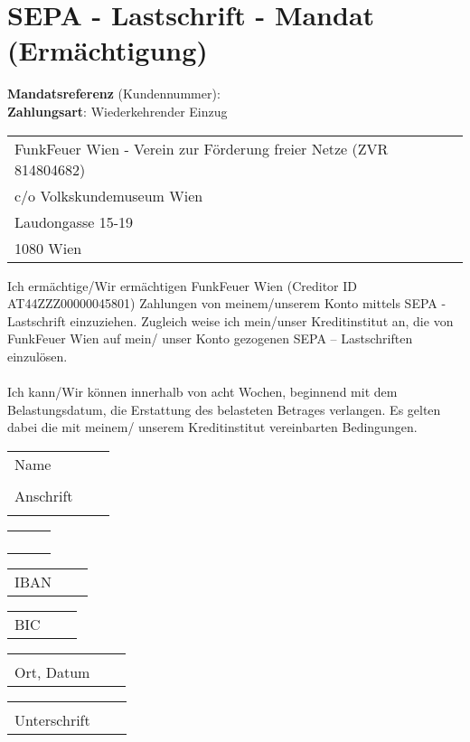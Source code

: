 \documentclass[parskip=half]{scrreprt}
\begin{document}
\chapter*{SEPA - Lastschrift - Mandat (Ermächtigung)}
\thispagestyle{fancy}

\textbf{Mandatsreferenz}  (Kundennummer): \MandateRef \\
\textbf{Zahlungsart}: Wiederkehrender Einzug\\

\begin{tabular}{p{15cm}p{0.5cm}l}
FunkFeuer Wien - Verein zur Förderung freier Netze (ZVR 814804682)\\
 c/o Volkskundemuseum Wien\\
 Laudongasse 15-19\\
 1080 Wien
\end{tabular}%

\vspace{0,5 cm}

\begin{contract}
Ich ermächtige/Wir ermächtigen FunkFeuer Wien (Creditor ID AT44ZZZ00000045801) Zahlungen von meinem/unserem Konto mittels SEPA - Lastschrift einzuziehen. Zugleich weise ich mein/unser Kreditinstitut an, die von FunkFeuer Wien auf mein/ unser Konto gezogenen SEPA – Lastschriften einzulösen.\\ \\
Ich kann/Wir können innerhalb von acht Wochen, beginnend mit dem Belastungsdatum, die Erstattung des belasteten Betrages verlangen. Es gelten dabei die mit meinem/ unserem Kreditinstitut vereinbarten Bedingungen.
\end{contract}


\begin{tabular}{p{2cm}p{.5cm}l}
Name\\ \\
Anschrift\\ \\
\end{tabular}
\hfill
\begin{tabular}{p{13cm}p{.5cm}l}
\dotfill \\ \\
\dotfill \\ \\
\end{tabular}

\begin{tabular}{p{9cm}p{.5cm}l}
IBAN \dotfill
\end{tabular}
\hfill
\begin{tabular}{p{4cm}p{.5cm}l}
BIC \dotfill
\end{tabular}



\vspace{1,5 cm}
\begin{tabular}{p{7cm}p{.5cm}l}
\dotfill \\
Ort, Datum
\end{tabular}
\hfill
\begin{tabular}{p{7cm}p{.5cm}l}
\dotfill \\
Unterschrift
\end{tabular}
\end{document}
